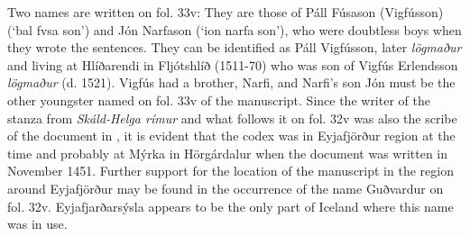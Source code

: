 \documentclass[11pt,twoside]{article}\makeatletter
\begin{document}
Two names are written on fol. 33v: They are those of Páll Fúsason (Vigfússon) (‘bal fvsa son’) and Jón Narfason (‘ion narfa son’), who were doubtless boys when they wrote the sentences. They can be identified as Páll Vigfússon, later \textit{lögmaður} and living at Hlíðarendi in Fljótshlíð (1511-70) who was son of Vigfús Erlendsson \textit{lögmaður} (d. 1521). Vigfús had a brother, Narfi, and Narfi’s son Jón must be the other youngster named on fol. 33v of the manuscript. Since the writer of the stanza from \textit{Skáld-Helga rímur} and what follows it on fol. 32v was also the scribe of the document in , it is evident that the codex was in Eyjafjörður region at the time and probably at Mýrka in Hörgárdalur when the document was written in November 1451. Further support for the location of the manuscript in the region around Eyjafjörður may be found in the occurrence of the name Guðvardur on fol. 32v. Eyjafjarðarsýsla appears to be the only part of Iceland where this name was in use.
\end{document}
